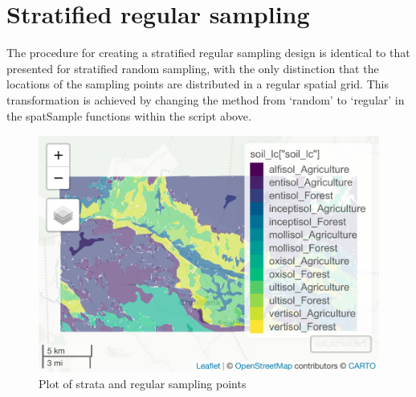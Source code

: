 \documentclass[
]{book}
\newenvironment{Shaded}{\begin{snugshade}}{\end{snugshade}}
\newcommand{\AttributeTok}[1]{\textcolor[rgb]{0.77,0.63,0.00}{#1}}
\newcommand{\DecValTok}[1]{\textcolor[rgb]{0.00,0.00,0.81}{#1}}
\newcommand{\FunctionTok}[1]{\textcolor[rgb]{0.00,0.00,0.00}{#1}}
\newcommand{\NormalTok}[1]{#1}
\newcommand{\SpecialCharTok}[1]{\textcolor[rgb]{0.00,0.00,0.00}{#1}}
\newcommand{\StringTok}[1]{\textcolor[rgb]{0.31,0.60,0.02}{#1}}
\begin{document}
\hypertarget{stratified-regular-sampling}{%
\section{Stratified regular sampling}\label{stratified-regular-sampling}}

The procedure for creating a stratified regular sampling design is identical to that presented for stratified random sampling, with the only distinction that the locations of the sampling points are distributed in a regular spatial grid. This transformation is achieved by changing the method from `random' to `regular' in the spatSample functions within the script above.

\begin{Shaded}
\end{Shaded}

\begin{figure}
\centering
\includegraphics{Technical-Manual-Soil-Sampling-Design_files/figure-latex/fig-12-1.pdf}
\caption{\label{fig:fig-12}Plot of strata and regular sampling points}
\end{figure}
\end{document}

